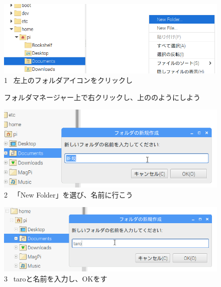 \begin{figure}[ht]
  \vspace{8mm}\\
  \centering
  \begin{minipage}{0.8\textwidth}
   \includegraphics[width=\linewidth]{text01-img/textbook-img034.png}
    1
    \ 左上のフォルダアイコンをクリックし

    フォルダマネージャー上で右クリックし、上ののようにしよう
  \end{minipage}
  \vspace{\baselineskip}

  \centering
  \begin{minipage}{0.8\textwidth}
   \includegraphics[width=\linewidth]{text01-img/textbook-img036.png}
    2
    \ 「New Folder」を選び、名前に行こう
  \end{minipage}
  \vspace{\baselineskip}

  \centering
  \begin{minipage}{0.8\textwidth}
  \includegraphics[width=\linewidth]{text01-img/textbook-img039.png}
    3
    \ taroと名前を入力し、OKをす
  \end{minipage}
  \vspace{\baselineskip}


\end{figure}
